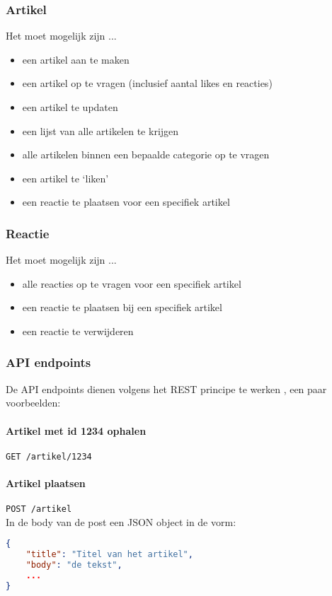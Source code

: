 \documentclass[a4paper]{article}
\begin{document}
\subsubsection{Artikel}
Het moet mogelijk zijn ...
\begin{itemize}
\item een artikel aan te maken
\item een artikel op te vragen (inclusief aantal likes en reacties)
\item een artikel te updaten
\item een lijst van alle artikelen te krijgen
\item alle artikelen binnen een bepaalde categorie op te vragen
\item een artikel te `liken'
\item een reactie te plaatsen voor een specifiek artikel
\end{itemize}

\subsubsection{Reactie}
Het moet mogelijk zijn ...
\begin{itemize}
\item alle reacties op te vragen voor een specifiek artikel
\item een reactie te plaatsen bij een specifiek artikel
\item een reactie te verwijderen
\end{itemize}

\subsubsection{API endpoints}
De API endpoints dienen volgens het REST principe te werken \cite{rest}, een paar voorbeelden:

\paragraph{Artikel met id 1234 ophalen}
\lstinline{GET /artikel/1234}
\paragraph{Artikel plaatsen}
\lstinline{POST /artikel}\\
In de body van de post een JSON object in de vorm:\\
\begin{lstlisting}[language=json]
{
	"title": "Titel van het artikel",
	"body": "de tekst",
	...
}
\end{lstlisting}
\end{document}
